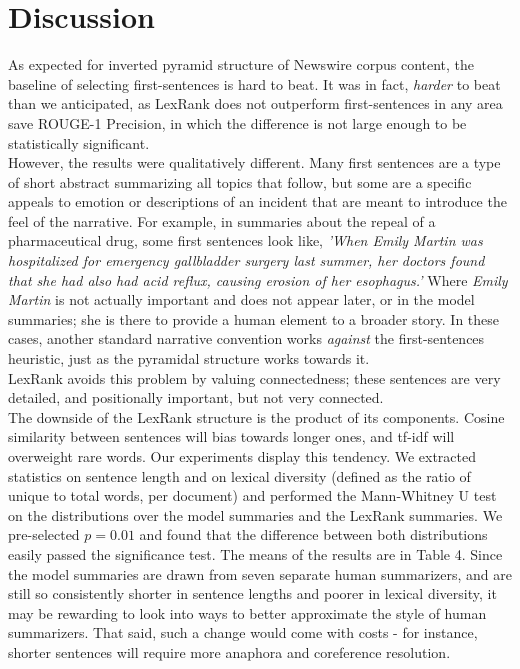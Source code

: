 \documentclass[11pt]{article}
\begin{document}
\section{Discussion}
As expected for inverted pyramid structure of Newswire corpus content, the baseline of selecting first-sentences is hard to beat. It was in fact, \textit{harder} to beat than we anticipated, as LexRank does not outperform first-sentences in any area save ROUGE-1 Precision, in which the difference is not large enough to be statistically significant. \\
However, the results were qualitatively different. Many first sentences are a type of short abstract summarizing all topics that follow, but some are a specific appeals to emotion or descriptions of an incident that are meant to introduce the feel of the narrative. For example, in summaries about the repeal of a pharmaceutical drug, some first sentences look like, \textit{'When Emily Martin was hospitalized for emergency gallbladder surgery last summer, her doctors found that she had also had acid reflux, causing erosion of her esophagus.'} Where \textit{Emily Martin} is not actually important and does not appear later, or in the model summaries; she is there to provide a human element to a broader story. In these cases, another standard narrative convention works \textit{against} the first-sentences heuristic, just as the pyramidal structure works towards it.\\
LexRank avoids this problem by valuing connectedness; these sentences are very detailed, and positionally important, but not very connected.\\
The downside of the LexRank structure is the product of its components. Cosine similarity between sentences will bias towards longer ones, and tf-idf will overweight rare words. Our experiments display this tendency. We extracted statistics on sentence length and on lexical diversity (defined as the ratio of unique to total words, per document) and performed the Mann-Whitney U test on the distributions over the model summaries and the LexRank summaries. We pre-selected $p=0.01$ and found that the difference between both distributions easily passed the significance test. The means of the results are in Table 4. Since the model summaries are drawn from seven separate human summarizers, and are still so consistently shorter in sentence lengths and poorer in lexical diversity, it may be rewarding to look into ways to better approximate the style of human summarizers. That said, such a change would come with costs - for instance, shorter sentences will require more anaphora and coreference resolution.\\ 
\end{document}
